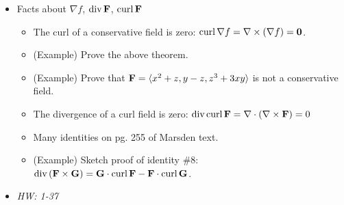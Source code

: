 \documentclass[11pt]{article}
\begin{document}
\begin{itemize}
  \item Facts about \(\nabla f\), \(\textrm{div}\, \mathbf{F}\), \(\textrm{curl}\, \mathbf{F}\)
    \begin{itemize}
      \item The curl of a conservative field is zero:
        \(\textrm{curl}\, \nabla f = \nabla \times (\nabla f) = \mathbf{0}\).
      \item (Example) Prove the above theorem.
      \item (Example) Prove that \(\mathbf{F}=\langle x^2+z,y-z,z^3+3xy\rangle\) is not a
            conservative field.
      \item The divergence of a curl field is zero:
        \(\textrm{div}\, \textrm{curl}\, \mathbf{F} = \nabla\cdot(\nabla\times \mathbf{F})=0\)
      \item Many identities on pg. 255 of Marsden text.
      \item (Example) Sketch proof of identity \#8:
        \(\textrm{div}\,(\mathbf{F}\times\mathbf{G})=\mathbf{G}\cdot\textrm{curl}\,\mathbf{F}-\mathbf{F}\cdot\textrm{curl}\,\mathbf{G}\).
    \end{itemize}
  \item\textit{
    HW: 1-37
  }
\end{itemize}
\end{document}
